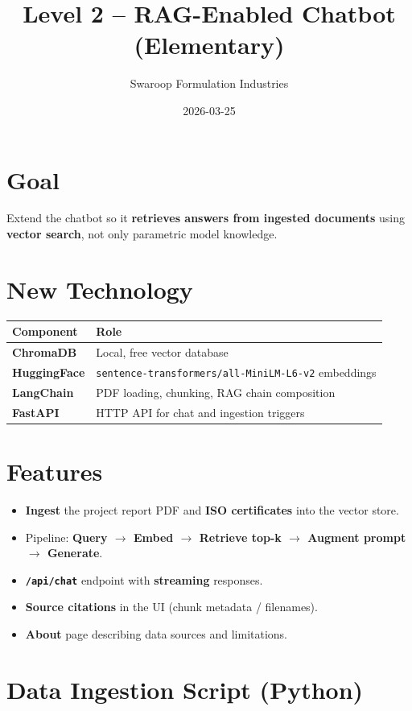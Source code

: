\documentclass{article}
\title{Level 2 -- RAG-Enabled Chatbot (Elementary)}
\author{Swaroop Formulation Industries}
\date{2026-03-25}
\begin{document}
\maketitle

\section{Goal}

Extend the chatbot so it \textbf{retrieves answers from ingested documents} using \textbf{vector search}, not only parametric model knowledge.

\section{New Technology}

\begin{tabular}{@{}lp{8.5cm}@{}}
\toprule
\textbf{Component} & \textbf{Role} \\
\midrule
\textbf{ChromaDB} & Local, free vector database \\
\textbf{HuggingFace} & \texttt{sentence-transformers/all-MiniLM-L6-v2} embeddings \\
\textbf{LangChain} & PDF loading, chunking, RAG chain composition \\
\textbf{FastAPI} & HTTP API for chat and ingestion triggers \\
\bottomrule
\end{tabular}

\section{Features}

\begin{itemize}[leftmargin=*]
  \item \textbf{Ingest} the project report PDF and \textbf{ISO certificates} into the vector store.
  \item Pipeline: \textbf{Query $\rightarrow$ Embed $\rightarrow$ Retrieve top-k $\rightarrow$ Augment prompt $\rightarrow$ Generate}.
  \item \textbf{\texttt{/api/chat}} endpoint with \textbf{streaming} responses.
  \item \textbf{Source citations} in the UI (chunk metadata / filenames).
  \item \textbf{About} page describing data sources and limitations.
\end{itemize}

\section{Data Ingestion Script (Python)}
\end{document}
